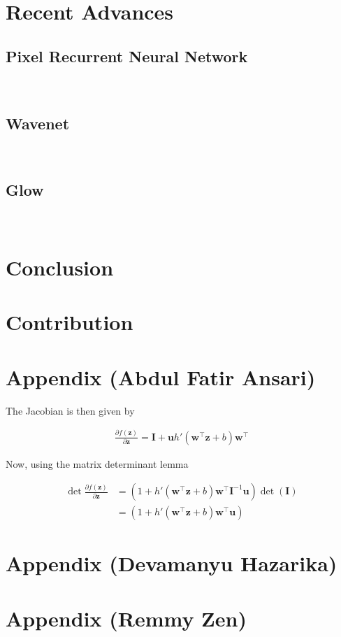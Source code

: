 \documentclass[runningheads]{llncs}
\begin{document}
\section{Recent Advances}
\subsection{Pixel Recurrent Neural Network}
~\cite{oord2016pixel}
\subsection{Wavenet}
~\cite{van2016wavenet}
\subsection{Glow}
~\cite{kingma2018glow}



\section{Conclusion}


\section{Contribution}

%
%
%
% 
% 
%

 

\appendix

\section{Appendix (Abdul Fatir Ansari)}


The Jacobian is then given by

\begin{align*}
\frac{\partial f(\mathbf{z})}{\partial \mathbf{z}} = \mathbf{I} + \mathbf{u}h'(\mathbf{w}^\top\mathbf{z} + b)\mathbf{w}^\top
\end{align*}

Now, using the matrix determinant lemma

\begin{align}
\det\frac{\partial f(\mathbf{z})}{\partial \mathbf{z}} &= (1 + h'(\mathbf{w}^\top\mathbf{z} + b)\mathbf{w}^\top\mathbf{I}^{-1}\mathbf{u})\det(\mathbf{I})\\
&=(1 + h'(\mathbf{w}^\top\mathbf{z} + b)\mathbf{w}^\top\mathbf{u})\label{eq:planar-det}
\end{align}

\section{Appendix (Devamanyu Hazarika)}
\section{Appendix (Remmy Zen)}
\end{document}
